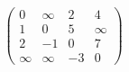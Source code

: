$$\begin{pmatrix}
    0 & {\infty}  & 2  & 4  \\ 
    1 & 0  & 5  & \infty  \\ 
    2 & -1  & 0  & 7  \\ 
    \infty & {\infty}  & -3  & 0 
\end{pmatrix}$$
